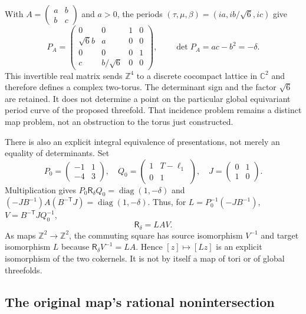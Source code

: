 With $A=\left(\begin{smallmatrix}a&b\\b&c\end{smallmatrix}\right)$ and
$a>0$, the periods $(\tau,\mu,\beta)=(ia,ib/\sqrt6,ic)$ give
\[
 P_A=\begin{pmatrix}
 0&0&1&0\\ \sqrt6 b&a&0&0\\0&0&0&1\\c&b/\sqrt6&0&0
 \end{pmatrix},\qquad
 \det P_A=ac-b^2=-\delta.
\]
This invertible real matrix sends $\mathbb Z^4$ to a discrete cocompact
lattice in $\mathbb C^2$ and therefore defines a complex two-torus.
The determinant sign and the factor $\sqrt6$ are retained.
It does not determine a point on the particular global equivariant period
curve of the proposed threefold. That incidence problem remains a distinct
map problem, not an obstruction to the torus just constructed.

There is also an explicit integral equivalence of presentations, not merely
an equality of determinants. Set
\[
 P_0=\begin{pmatrix}-1&1\\-4&3\end{pmatrix},\quad
 Q_0=\begin{pmatrix}1&T-\ell_1\\0&1\end{pmatrix},\quad
 J=\begin{pmatrix}0&1\\1&0\end{pmatrix}.
\]
Multiplication gives $P_0\mathsf R_\delta Q_0=\operatorname{diag}(1,-\delta)$
and $(-JB^{-1})A(B^{-\mathsf T}J)=\operatorname{diag}(1,-\delta)$.
Thus, for $L=P_0^{-1}(-JB^{-1})$, $V=B^{-\mathsf T}JQ_0^{-1}$,
\[
 \mathsf R_\delta=LAV.
\]
As maps $\mathbb Z^2\to\mathbb Z^2$, the commuting square has source
isomorphism $V^{-1}$ and target isomorphism $L$ because
$\mathsf R_\delta V^{-1}=LA$. Hence $[z]\mapsto[Lz]$ is an explicit
isomorphism of the two cokernels. It is not by itself a map of tori or of
global threefolds.

\subsection{The original map's rational nonintersection}

